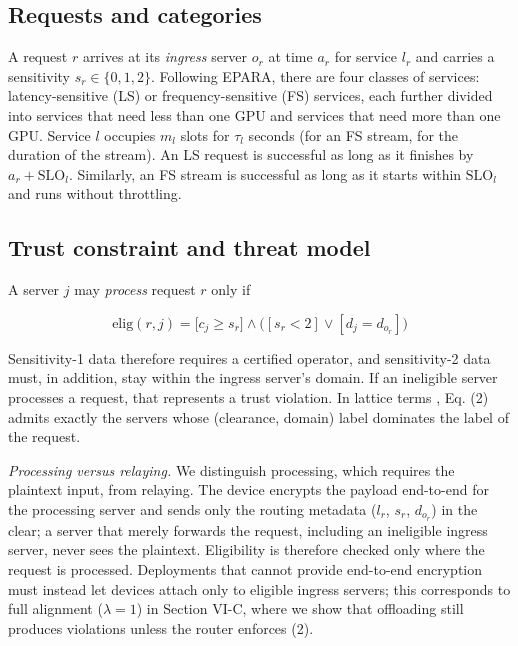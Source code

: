 \documentclass[journal]{IEEEtran}
\begin{document}
\subsection{Requests and categories}

A request \(r\) arrives at its \emph{ingress} server \(o_r\) at time \(a_r\) for service \(l_r\) and carries a sensitivity \(s_r\in\{0,1,2\}\). Following EPARA, there are four classes of services: latency-sensitive (LS) or frequency-sensitive (FS) services, each further divided into services that need less than one GPU and services that need more than one GPU. Service \(l\) occupies \(m_l\) slots for \(\tau_l\) seconds (for an FS stream, for the duration of the stream). An LS request is successful as long as it finishes by \(a_r+\mathrm{SLO}_l\). Similarly, an FS stream is successful as long as it starts within \(\mathrm{SLO}_l\) and runs without throttling.

\subsection{Trust constraint and threat model}

A server \(j\) may \emph{process} request \(r\) only if

\begin{equation}
\mathrm{elig}(r,j)=\big[c_j\ge s_r\big]\wedge\big([s_r<2]\vee[d_j=d_{o_r}]\big)
\end{equation}

Sensitivity-1 data therefore requires a certified operator, and sensitivity-2 data must, in addition, stay within the ingress server's domain. If an ineligible server processes a request, that represents a trust violation. In lattice terms \cite{bell1973,denning1976}, Eq. (2) admits exactly the servers whose (clearance, domain) label dominates the label of the request.

\emph{Processing versus relaying.} We distinguish processing, which requires the plaintext input, from relaying. The device encrypts the payload end-to-end for the processing server and sends only the routing metadata (\(l_r\), \(s_r\), \(d_{o_r}\)) in the clear; a server that merely forwards the request, including an ineligible ingress server, never sees the plaintext. Eligibility is therefore checked only where the request is processed. Deployments that cannot provide end-to-end encryption must instead let devices attach only to eligible ingress servers; this corresponds to full alignment (\(\lambda=1\)) in Section VI-C, where we show that offloading still produces violations unless the router enforces (2).
\end{document}
